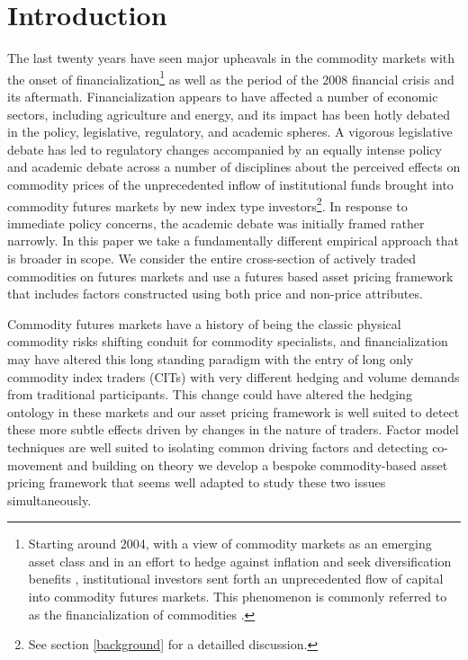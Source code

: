 \documentclass[12pt,]{article}
\let\rmarkdownfootnote\footnote%
\def\footnote{\protect\rmarkdownfootnote}
\begin{document}
\newpage

\hypertarget{introduction}{%
\section{Introduction}\label{introduction}}

The last twenty years have seen major upheavals in the commodity markets
with the onset of financialization\footnote{Starting around 2004, with a
  view of commodity markets as an emerging asset class and in an effort
  to hedge against inflation and seek diversification benefits
  \citep{buyuksahin_speculators_2014, singleton_investor_2013},
  institutional investors sent forth an unprecedented flow of capital
  into commodity futures markets. This phenomenon is commonly referred
  to as the financialization of commodities
  \citep{domanski_financial_2007}.} as well as the period of the 2008
financial crisis and its aftermath. Financialization appears to have
affected a number of economic sectors, including agriculture and energy,
and its impact has been hotly debated in the policy, legislative,
regulatory, and academic spheres. A vigorous legislative debate has led
to regulatory changes accompanied by an equally intense policy and
academic debate across a number of disciplines about the perceived
effects on commodity prices of the unprecedented inflow of institutional
funds brought into commodity futures markets by new index type
investors\footnote{See section \ref{background} for a detailled
  discussion.}. In response to immediate policy concerns, the academic
debate was initially framed rather narrowly. In this paper we take a
fundamentally different empirical approach that is broader in scope. We
consider the entire cross-section of actively traded commodities on
futures markets and use a futures based asset pricing framework that
includes factors constructed using both price and non-price attributes.

Commodity futures markets have a history of being the classic physical
commodity risks shifting conduit for commodity specialists, and
financialization may have altered this long standing paradigm with the
entry of long only commodity index traders (CITs) with very different
hedging and volume demands from traditional participants. This change
could have altered the hedging ontology in these markets and our asset
pricing framework is well suited to detect these more subtle effects
driven by changes in the nature of traders. Factor model techniques are
well suited to isolating common driving factors and detecting
co-movement and building on theory we develop a bespoke commodity-based
asset pricing framework that seems well adapted to study these two
issues simultaneously.
\end{document}

